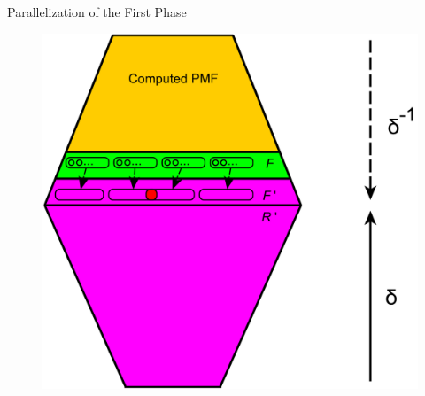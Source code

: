 \documentclass{beamer}
\begin{document}
\begin{frame}{Parallelization of the First Phase}
	\begin{figure}
		\includegraphics[height=0.8\textheight]{figs/f2r_parallel.pdf}
	\end{figure}
\end{frame}
%
%	
%	
\end{document}
